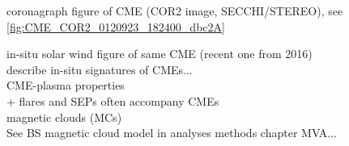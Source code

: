 coronagraph figure of CME (COR2 image, SECCHI/STEREO), see \autoref{fig:CME_COR2_0120923_182400_dbc2A}\\
\begin{figure}[htb]
\end{figure}

in-situ solar wind figure of same CME (recent one from 2016)\\
describe in-situ signatures of CMEs...\\

CME-plasma properties\\
+ flares and SEPs often accompany CMEs\\

magnetic clouds (MCs)\\
See BS magnetic cloud model in analyses methods chapter
MVA...\\

